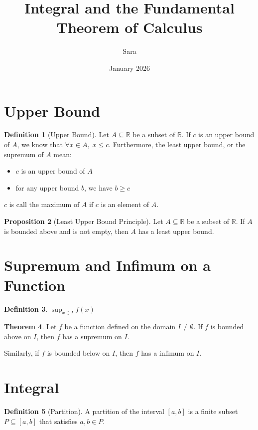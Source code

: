 \documentclass{article}
\title{Integral and the Fundamental Theorem of Calculus}
\author{Sara}
\date{January 2026}
\theoremstyle{definition}
\newtheorem{theorem}{Theorem}[section]
\newtheorem{proposition}[theorem]{Proposition}
\newtheorem{definition}[theorem]{Definition}
\theoremstyle{remark}
\begin{document}
\maketitle

\section{Upper Bound}

\begin{definition}[Upper Bound]
    Let $A\subseteq \mathbb{R}$ be a subset of $\mathbb{R}$. If $c$ is an upper bound of $A$, we know that $\forall x\in A,\;x\leq c$.
    Furthermore, the least upper bound, or the supremum of $A$ mean:
    \begin{itemize}
        \item $c$ is an upper bound of $A$
        \item for any upper bound $b$, we have $b\geq c$
    \end{itemize}
    $c$ is call the maximum of $A$ if $c$ is an element of $A$.
\end{definition}

\begin{proposition}[Least Upper Bound Principle]
    Let $A\subseteq \mathbb{R}$ be a subset of $\mathbb{R}$.
    If $A$ is bounded above and is not empty, then $A$ has a least upper bound.
\end{proposition}

\section{Supremum and Infimum on a Function}

\begin{definition}
    $\sup_{x\in I}f(x)$
\end{definition}

\begin{theorem}
    Let $f$ be a function defined on the domain $I\neq \emptyset$. If $f$ is bounded above on $I$, then $f$ has a supremum on $I$.

    Similarly, if $f$ is bounded below on $I$, then $f$ has a infimum on $I$.
\end{theorem}

\section{Integral}

\begin{definition}[Partition]
    A partition of the interval $[a,b]$ is a finite subset $P\subseteq[a,b]$ that satisfies $a,b\in P$.
\end{definition}
\end{document}
